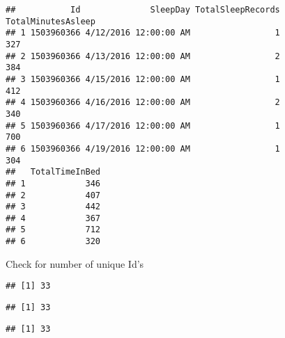 \documentclass[
]{article}
\newenvironment{Shaded}{\begin{snugshade}}{\end{snugshade}}
\newcommand{\FunctionTok}[1]{\textcolor[rgb]{0.00,0.00,0.00}{#1}}
\newcommand{\NormalTok}[1]{#1}
\newcommand{\SpecialCharTok}[1]{\textcolor[rgb]{0.00,0.00,0.00}{#1}}
\begin{document}
\begin{verbatim}
##           Id              SleepDay TotalSleepRecords TotalMinutesAsleep
## 1 1503960366 4/12/2016 12:00:00 AM                 1                327
## 2 1503960366 4/13/2016 12:00:00 AM                 2                384
## 3 1503960366 4/15/2016 12:00:00 AM                 1                412
## 4 1503960366 4/16/2016 12:00:00 AM                 2                340
## 5 1503960366 4/17/2016 12:00:00 AM                 1                700
## 6 1503960366 4/19/2016 12:00:00 AM                 1                304
##   TotalTimeInBed
## 1            346
## 2            407
## 3            442
## 4            367
## 5            712
## 6            320
\end{verbatim}

Check for number of unique Id's

\begin{Shaded}
\end{Shaded}

\begin{verbatim}
## [1] 33
\end{verbatim}

\begin{Shaded}
\end{Shaded}

\begin{verbatim}
## [1] 33
\end{verbatim}

\begin{Shaded}
\end{Shaded}

\begin{verbatim}
## [1] 33
\end{verbatim}

\begin{Shaded}
\end{Shaded}
\end{document}
